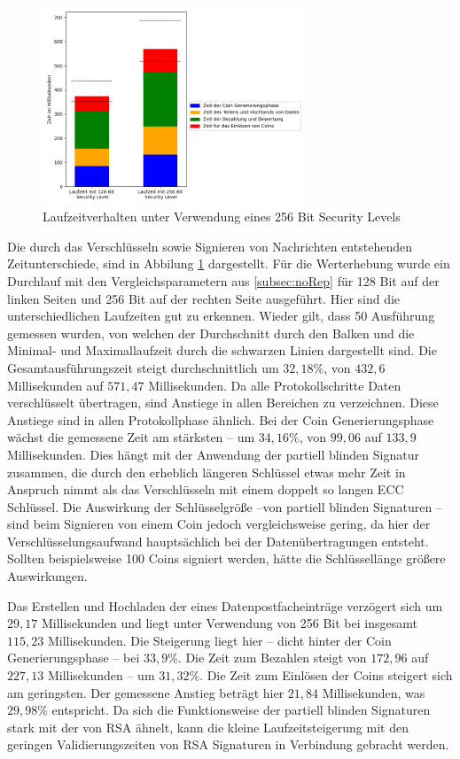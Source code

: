 \documentclass[
	fontsize=11pt,
	headings=small,
	parskip=half,           %
	bibliography=totoc,
	numbers=noenddot,       %
	open=any,               %
]{scrreprt}
\begin{document}
\begin{figure}[h]
    \caption{Laufzeitverhalten unter Verwendung eines 256 Bit Security Levels}
    \label{fig:win_256bit}
    \centering
    \includegraphics[width=0.7\textwidth]{figure_win_256Bit_withOnlyOnes.png}
\end{figure}
Die durch das Verschlüsseln sowie Signieren von Nachrichten entstehenden Zeitunterschiede, sind in Abbilung \ref{fig:win_256bit} dargestellt. Für die Werterhebung wurde ein Durchlauf mit den Vergleichsparametern aus \ref{subsec:noRep} für 128 Bit auf der linken Seiten und 256 Bit auf der rechten Seite ausgeführt. Hier sind die unterschiedlichen Laufzeiten gut zu erkennen. Wieder gilt, dass 50 Ausführung gemessen wurden, von welchen der Durchschnitt durch den Balken und die Minimal- und Maximallaufzeit durch die schwarzen Linien dargestellt sind. Die Gesamtausführungszeit steigt durchschnittlich um $32,18\%$, von $432,6$ Millisekunden auf $571,47$ Millisekunden. Da alle Protokollschritte Daten verschlüsselt übertragen, sind Anstiege in allen Bereichen zu verzeichnen. Diese Anstiege sind in allen Protokollphase ähnlich. Bei der Coin Generierungsphase wächst die gemessene Zeit am stärksten -- um $34,16\%$, von $99,06$ auf $133,9$ Millisekunden. Dies hängt mit der Anwendung der partiell blinden Signatur zusammen, die durch den erheblich längeren Schlüssel etwas mehr Zeit in Anspruch nimmt als das Verschlüsseln mit einem doppelt so langen ECC Schlüssel. Die Auswirkung der Schlüsselgröße --von partiell blinden Signaturen -- sind beim Signieren von einem Coin jedoch vergleichsweise gering, da hier der Verschlüsselungsaufwand hauptsächlich bei der Datenübertragungen entsteht. Sollten beispielsweise 100 Coins signiert werden, hätte die Schlüssellänge größere Auswirkungen.

Das Erstellen und Hochladen der eines Datenpostfacheinträge verzögert sich um $29,17$ Millisekunden und liegt unter Verwendung von 256 Bit bei insgesamt $115,23$ Millisekunden. Die Steigerung liegt hier -- dicht hinter der Coin Generierungsphase -- bei $33,9\%$. Die Zeit zum Bezahlen steigt von $172,96$ auf $227,13$ Millisekunden -- um $31,32\%$. Die Zeit zum Einlösen der Coins steigert sich am geringsten. Der gemessene Anstieg beträgt hier $21,84$ Millisekunden, was $29,98\%$ entspricht. Da sich die Funktionsweise der partiell blinden Signaturen stark mit der von RSA ähnelt, kann die kleine Laufzeitsteigerung mit den geringen Validierungszeiten von RSA Signaturen \cite{rsa-Singh2016Performance} in Verbindung gebracht werden.
\end{document}
